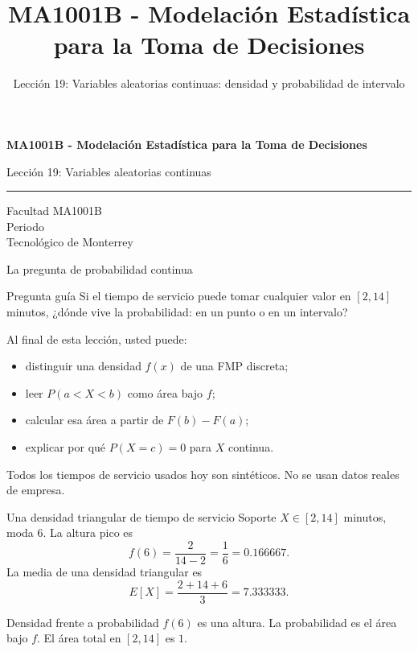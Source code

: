 \documentclass[aspectratio=169,10pt,spanish]{beamer}
\title{MA1001B - Modelación Estadística para la Toma de Decisiones}
\subtitle{Lección 19: Variables aleatorias continuas: densidad y probabilidad de intervalo}
\author{}
\institute{Tecnol\'ogico de Monterrey}
\date{}
\begin{document}
\begin{frame}[plain]
  \vspace{1.2cm}
  {\Large\bfseries MA1001B - Modelación Estadística para la Toma de Decisiones\par}
  \vspace{0.7cm}
  {\large Lección 19: Variables aleatorias continuas\par}
  \vspace{0.7cm}
  {\color{TecRojo}\rule{\textwidth}{1.2pt}}
  \vspace{0.8cm}

  Facultad MA1001B\\[0.3cm]
  Periodo\\[0.3cm]
  Tecnol\'ogico de Monterrey
\end{frame}

\begin{frame}{La pregunta de probabilidad continua}
  \begin{alertblock}{Pregunta guía}
    Si el tiempo de servicio puede tomar cualquier valor en $[2, 14]$ minutos,
    ¿dónde vive la probabilidad: en un punto o en un intervalo?
  \end{alertblock}

  \vspace{0.6em}
  Al final de esta lección, usted puede:
  \begin{itemize}
    \item distinguir una densidad $f(x)$ de una FMP discreta;
    \item leer $P(a<X<b)$ como área bajo $f$;
    \item calcular esa área a partir de $F(b)-F(a)$;
    \item explicar por qué $P(X=c)=0$ para $X$ continua.
  \end{itemize}

  \vfill
  \scriptsize Todos los tiempos de servicio usados hoy son sintéticos. No se usan datos reales de empresa.
\end{frame}

\begin{frame}{Una densidad triangular de tiempo de servicio}
  \small
  Soporte $X\in[2,14]$ minutos, moda $6$. La altura pico es
  \[
    f(6)=\frac{2}{14-2}=\frac{1}{6}=0.166667.
  \]
  La media de una densidad triangular es
  \[
    E[X]=\frac{2+14+6}{3}=7.333333.
  \]

  \vspace{0.4em}
  \begin{exampleblock}{Densidad frente a probabilidad}
    $f(6)$ es una altura. La probabilidad es el área bajo $f$. El área total
    en $[2,14]$ es $1$.
  \end{exampleblock}
\end{frame}
\end{document}
